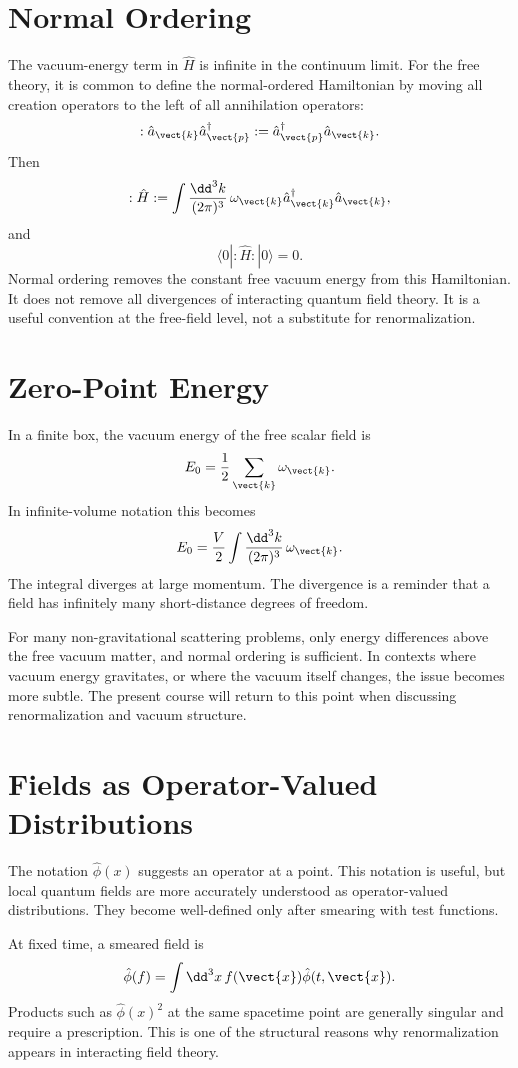 \section{Normal Ordering}

The vacuum-energy term in \(\hat H\) is infinite in the continuum limit. For the
free theory, it is common to define the normal-ordered Hamiltonian by moving all
creation operators to the left of all annihilation operators:
\[
    :\hat a_{\vect{k}}\hat a_{\vect{p}}^\dagger:
    = \hat a_{\vect{p}}^\dagger\hat a_{\vect{k}}.
\]
Then
\[
    :\hat H:
    = \int \frac{\dd^3k}{(2\pi)^3}\,
      \omega_{\vect{k}}\hat a_{\vect{k}}^\dagger\hat a_{\vect{k}},
\]
and
\[
    \langle0|:\hat H:|0\rangle=0.
\]
Normal ordering removes the constant free vacuum energy from this Hamiltonian.
It does not remove all divergences of interacting quantum field theory. It is a
useful convention at the free-field level, not a substitute for
renormalization.

\section{Zero-Point Energy}

In a finite box, the vacuum energy of the free scalar field is
\[
    E_0
    = \frac{1}{2}\sum_{\vect{k}}\omega_{\vect{k}}.
\]
In infinite-volume notation this becomes
\[
    E_0
    = \frac{V}{2}\int\frac{\dd^3k}{(2\pi)^3}\,\omega_{\vect{k}}.
\]
The integral diverges at large momentum. The divergence is a reminder that a
field has infinitely many short-distance degrees of freedom.

For many non-gravitational scattering problems, only energy differences above
the free vacuum matter, and normal ordering is sufficient. In contexts where
vacuum energy gravitates, or where the vacuum itself changes, the issue becomes
more subtle. The present course will return to this point when discussing
renormalization and vacuum structure.

\section{Fields as Operator-Valued Distributions}

The notation \(\hat\phi(x)\) suggests an operator at a point. This notation is
useful, but local quantum fields are more accurately understood as
operator-valued distributions. They become well-defined only after smearing with
test functions.

At fixed time, a smeared field is
\[
    \hat\phi(f)
    = \int\dd^3x\,f(\vect{x})\hat\phi(t,\vect{x}).
\]
Products such as \(\hat\phi(x)^2\) at the same spacetime point are generally
singular and require a prescription. This is one of the structural reasons why
renormalization appears in interacting field theory.

